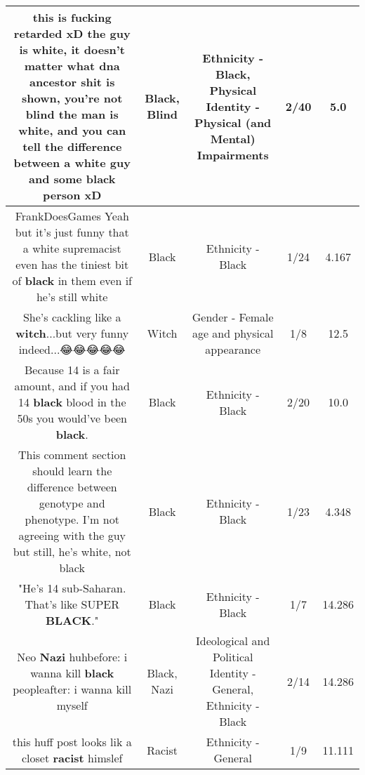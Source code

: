 \documentclass[11pt]{article}
\newlength\mylength
\begin{document}
\begin{center}
\begin{longtable}{|C{.65\mylength}|C{.30\mylength}|C{.12\mylength}|C{.12\mylength}|C{.12\mylength}|}
  \small this is fucking retarded xD the guy is white, it doesn't matter what dna ancestor shit is shown, you're not \textbf{blind} the man is white, and you can tell the difference between a white guy and some \textbf{black} person xD\normalsize   & Black, Blind & Ethnicity - Black, Physical Identity - Physical (and Mental) Impairments & 2/40 & 5.0 \\  \hline
  \small FrankDoesGames Yeah but it's just funny that a white supremacist even has the tiniest bit of \textbf{black} in them even if he's still white\normalsize   & Black & Ethnicity - Black & 1/24 & 4.167 \\  \hline
  \small She's cackling like a \textbf{witch}...but very funny indeed...😂😂😂😂😂\normalsize   & Witch & Gender - Female age and physical appearance & 1/8 & 12.5 \\  \hline
  \small Because 14 is a fair amount, and if you had 14 \textbf{black} blood in the 50s you would've been \textbf{black}.\normalsize   & Black & Ethnicity - Black & 2/20 & 10.0 \\  \hline
  \small This comment section should learn the difference between genotype and phenotype. I'm not agreeing with the guy but still, he's white, not black\normalsize   & Black & Ethnicity - Black & 1/23 & 4.348 \\  \hline
  \small "He's 14 sub-Saharan. That's like SUPER \textbf{BLACK}."\normalsize   & Black & Ethnicity - Black & 1/7 & 14.286 \\  \hline
  \small Neo \textbf{Nazi} huhbefore: i wanna kill \textbf{black} peopleafter: i wanna kill myself\normalsize   & Black, Nazi &  Ideological and Political Identity - General, Ethnicity - Black & 2/14 & 14.286 \\  \hline
  \small this huff post looks lik a closet \textbf{racist} himslef\normalsize   & Racist & Ethnicity - General & 1/9 & 11.111 \\  \hline

\end{longtable}
\end{center}
\end{document}
